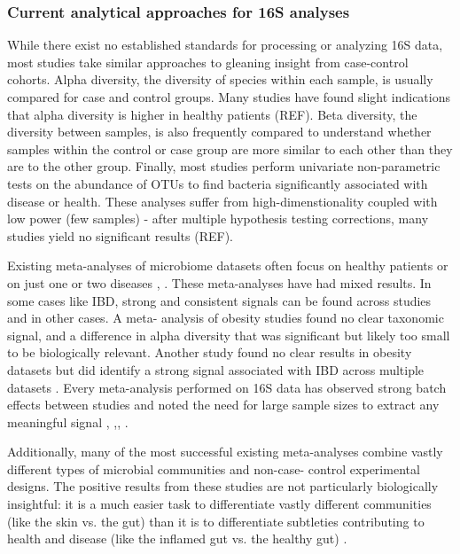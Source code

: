 \documentclass[12pt]{article}
\begin{document}
\subsubsection{Current analytical approaches for 16S analyses}
While there exist no established standards for processing or analyzing 
16S data, most studies take similar approaches to gleaning insight 
from case-control cohorts. Alpha diversity, the diversity of species 
within each sample, is usually compared for case and control groups. 
Many studies have found slight indications that alpha diversity is 
higher in healthy patients (REF). Beta diversity, the diversity 
between samples, is also frequently compared to understand whether 
samples within the control or case group are more similar to each 
other than they are to the other group. Finally, most studies perform 
univariate non-parametric tests on the abundance of OTUs to find 
bacteria significantly associated with disease or health. These 
analyses suffer from high-dimenstionality coupled with low power (few 
samples) - after multiple hypothesis testing corrections, many studies 
yield no significant results (REF).

Existing meta-analyses of microbiome datasets often focus on healthy 
patients or on just one or two diseases \cite{walters-ob_meta-2014}, \cite{sze-signal-2016}. These meta-analyses 
have had mixed results. In some cases like IBD, strong and consistent 
signals can be found across studies and in other cases. A meta-
analysis of obesity studies found no clear taxonomic signal, and a 
difference in alpha diversity that was significant but likely too 
small to be biologically relevant\cite{sze-signal-2016}. Another study 
found no clear results in obesity datasets but did identify a strong 
signal associated with IBD across multiple datasets \cite{walters-ob_meta-2014}. 
Every meta-analysis performed on 16S data has observed 
strong batch effects between studies and noted the need for large 
sample sizes to extract any meaningful signal \cite{sze-signal-2016},
\cite{walters-ob_meta-2014},\cite{knights-supervised-2010},
\cite{lozupone-meta-2013}. 

Additionally, many of the most successful existing meta-analyses 
combine vastly different types of microbial communities and non-case-
control experimental designs. The positive results from these studies 
are not particularly biologically insightful: it is a much easier task 
to differentiate vastly different communities (like the skin vs. the 
gut) than it is to differentiate subtleties contributing to health and 
disease (like the inflamed gut vs. the healthy gut) \cite{knights-supervised-2010}.
\end{document}
